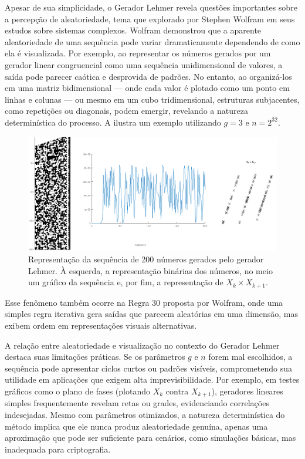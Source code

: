 Apesar de sua simplicidade, o Gerador Lehmer revela questões importantes sobre a
percepção de aleatoriedade, tema que explorado por Stephen Wolfram em seus
estudos sobre sistemas complexos. Wolfram demonstrou que a aparente
aleatoriedade de uma sequência pode variar dramaticamente dependendo de como
ela é visualizada. Por exemplo, ao representar os números gerados por um gerador linear congruencial
como uma sequência unidimensional de valores, a saída pode parecer caótica e
desprovida de padrões. No entanto, ao organizá-los em uma matriz
bidimensional --- onde cada valor é plotado como um ponto em linhas e colunas
--- ou mesmo em um cubo tridimensional, estruturas subjacentes, como repetições
ou diagonais, podem emergir, revelando a natureza determinística do processo.
A  ilustra um exemplo utilizando $g=3$ e $n=2^{32}$.
\begin{figure}
  \centering
  \includegraphics[width=\linewidth]{plots/lehmer.png}
  \caption{Representação da sequência de 200 números gerados pelo gerador Lehmer.
  À esquerda, a representação binárias dos números, no meio um gráfico da sequência e,
  por fim, a representação de $X_k \times X_{k+1}$.}\label{fig:lehmer}
\end{figure}
Esse fenômeno também ocorre na Regra 30 proposta por Wolfram,
onde uma simples regra iterativa gera saídas que parecem aleatórias em uma dimensão, mas exibem ordem
em representações visuais alternativas.

A relação entre aleatoriedade e visualização no contexto do Gerador Lehmer
destaca suas limitações práticas. Se os parâmetros $g$ e $n$ forem mal
escolhidos, a sequência pode apresentar ciclos curtos ou padrões visíveis,
comprometendo sua utilidade em aplicações que exigem alta imprevisibilidade.
Por exemplo, em testes gráficos como o plano de fases (plotando $X_k$ contra
$X_{k+1}$), geradores lineares simples frequentemente revelam retas ou grades,
evidenciando correlações indesejadas. Mesmo com parâmetros otimizados, a
natureza determinística do método implica que ele nunca produz aleatoriedade
genuína, apenas uma aproximação que pode ser suficiente para cenários, como
simulações básicas, mas inadequada para criptografia.




